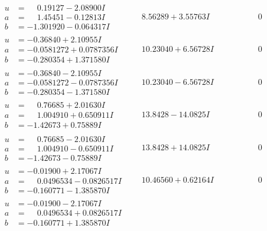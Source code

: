 \documentclass[1p]{elsarticle_modified}
\theoremstyle{definition}
\begin{document}
$$\begin{array}{c|c|c}
\begin{aligned}
u &= \phantom{-}0.19127 - 2.08900 I \\
a &= \phantom{-}1.45451 - 0.12813 I \\
b &= -1.301920 - 0.064317 I\end{aligned}
 & \phantom{-}8.56289 + 3.55763 I & \phantom{-0.000000 } 0 \\ \hline\begin{aligned}
u &= -0.36840 + 2.10955 I \\
a &= -0.0581272 + 0.0787356 I \\
b &= -0.280354 + 1.371580 I\end{aligned}
 & \phantom{-}10.23040 + 6.56728 I & \phantom{-0.000000 } 0 \\ \hline\begin{aligned}
u &= -0.36840 - 2.10955 I \\
a &= -0.0581272 - 0.0787356 I \\
b &= -0.280354 - 1.371580 I\end{aligned}
 & \phantom{-}10.23040 - 6.56728 I & \phantom{-0.000000 } 0 \\ \hline\begin{aligned}
u &= \phantom{-}0.76685 + 2.01630 I \\
a &= \phantom{-}1.004910 + 0.650911 I \\
b &= -1.42673 + 0.75889 I\end{aligned}
 & \phantom{-}13.8428 - 14.0825 I & \phantom{-0.000000 } 0 \\ \hline\begin{aligned}
u &= \phantom{-}0.76685 - 2.01630 I \\
a &= \phantom{-}1.004910 - 0.650911 I \\
b &= -1.42673 - 0.75889 I\end{aligned}
 & \phantom{-}13.8428 + 14.0825 I & \phantom{-0.000000 } 0 \\ \hline\begin{aligned}
u &= -0.01900 + 2.17067 I \\
a &= \phantom{-}0.0496534 - 0.0826517 I \\
b &= -0.160771 - 1.385870 I\end{aligned}
 & \phantom{-}10.46560 + 0.62164 I & \phantom{-0.000000 } 0 \\ \hline\begin{aligned}
u &= -0.01900 - 2.17067 I \\
a &= \phantom{-}0.0496534 + 0.0826517 I \\
b &= -0.160771 + 1.385870 I\end{aligned}

\end{array}$$
\end{document}
